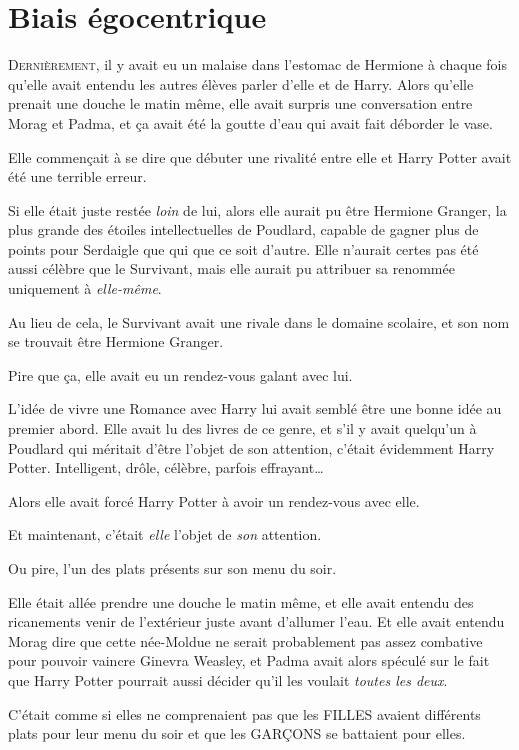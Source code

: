 \chapter{Biais égocentrique}

\lettrine{D}{ernièrement}, il y avait eu un malaise dans l'estomac de Hermione à chaque fois qu'elle avait entendu les autres élèves parler d'elle et de Harry. Alors qu'elle prenait une douche le matin même, elle avait surpris une conversation entre Morag et Padma, et ça avait été la goutte d'eau qui avait fait déborder le vase.

Elle commençait à se dire que débuter une rivalité entre elle et Harry Potter avait été une terrible erreur.

Si elle était juste restée \emph{loin} de lui, alors elle aurait pu être Hermione Granger, la plus grande des étoiles intellectuelles de Poudlard, capable de gagner plus de points pour Serdaigle que qui que ce soit d'autre. Elle n'aurait certes pas été aussi célèbre que le Survivant, mais elle aurait pu attribuer sa renommée uniquement à \emph{elle-même}.

Au lieu de cela, le Survivant avait une rivale dans le domaine scolaire, et son nom se trouvait être Hermione Granger.

Pire que ça, elle avait eu un rendez-vous galant avec lui.

L'idée de vivre une Romance avec Harry lui avait semblé être une bonne idée au premier abord. Elle avait lu des livres de ce genre, et s'il y avait quelqu'un à Poudlard qui méritait d'être l'objet de son attention, c'était évidemment Harry Potter. Intelligent, drôle, célèbre, parfois effrayant…

Alors elle avait forcé Harry Potter à avoir un rendez-vous avec elle.

Et maintenant, c'était \emph{elle} l'objet de \emph{son} attention.

Ou pire, l'un des plats présents sur son menu du soir.

Elle était allée prendre une douche le matin même, et elle avait entendu des ricanements venir de l'extérieur juste avant d'allumer l'eau. Et elle avait entendu Morag dire que cette née-Moldue ne serait probablement pas assez combative pour pouvoir vaincre Ginevra Weasley, et Padma avait alors spéculé sur le fait que Harry Potter pourrait aussi décider qu'il les voulait \emph{toutes les deux}.

C'était comme si elles ne comprenaient pas que les FILLES avaient différents plats pour leur menu du soir et que les GARÇONS se battaient pour elles.

